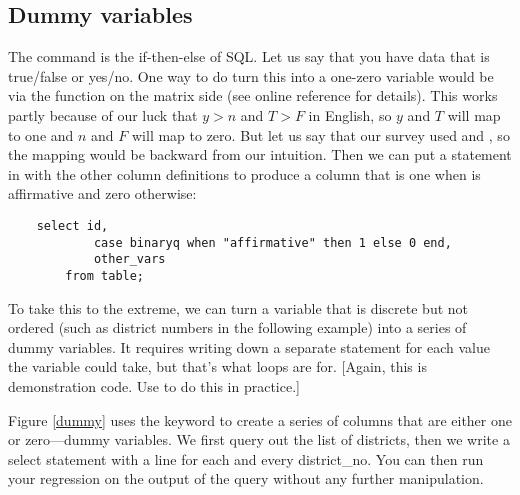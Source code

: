 \subsection{Dummy variables} 
The  command is the if-then-else of SQL. Let us say that you
have data that is true/false or yes/no. One way to do turn this into a
one-zero variable would be via
the  function on the matrix side
(see online reference for details). 
This works partly because of our
luck that $y > n$ and $T > F$ in English, so $y$ and $T$ will map to one
and $n$ and $F$ will map to zero. But let us say that our survey used
 and , so the mapping would be
backward from our intuition.  Then we can put a  statement in with the other
column definitions to produce a column that is one when
 is affirmative and zero otherwise:
\begin{lstlisting}
    select id, 
            case binaryq when "affirmative" then 1 else 0 end, 
            other_vars
        from table;
\end{lstlisting}


To take this to the extreme, we can turn a variable that is discrete
but not ordered (such as district numbers in the following example)
into a series of dummy variables. It requires writing down a separate
 statement for each value the variable could take, but
that's what  loops are for.  [Again, this is demonstration
code. Use  to do this in practice.]


Figure \ref{dummy} uses the  keyword to create a series of
columns that are either one or zero---dummy variables.  We first query
out the list of districts, then we write a select statement with a line
 for each and
every district\_no. You can then run your regression on the output of
the query without any further manipulation.

